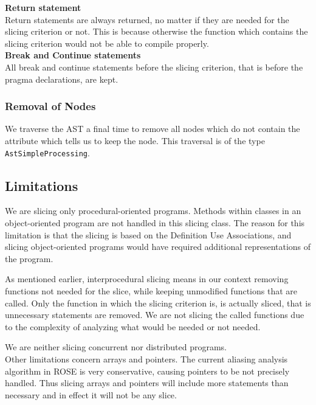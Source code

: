 \documentclass[11pt,a4paper,twoside]{article}
\begin{document}
\noindent
\textbf{Return statement}\\
Return statements are always returned, no matter if they are needed for the slicing criterion or not. This is because otherwise the function which contains the slicing criterion would not be able to compile properly.\\

\noindent
\textbf{Break and Continue statements}\\
All break and continue statements before the slicing criterion, that is before the pragma declarations, are kept.

\subsubsection{Removal of Nodes}
We traverse the AST a final time to remove all nodes which do not contain the attribute which tells us to keep the node. This traversal is of the type \texttt{AstSimpleProcessing}.

\subsection{Limitations}
We are slicing only procedural-oriented programs. Methods within classes in an object-oriented program are not handled in this slicing class. The reason for this limitation is that the slicing is based on the Definition Use Associations, and slicing object-oriented programs would have required additional representations of the program.

As mentioned earlier, interprocedural slicing means in our context removing functions not needed for the slice, while keeping unmodified functions that are called. Only the function in which the slicing criterion is, is actually sliced, that is unnecessary statements are removed. We are not slicing the called functions due to the complexity of analyzing what would be needed or not needed.

We are neither slicing concurrent nor distributed programs.\\

\noindent
Other limitations concern arrays and pointers. The current aliasing analysis algorithm in ROSE is very conservative, causing pointers to be not precisely handled. Thus slicing arrays and pointers will include more statements than necessary and in effect it will not be any slice.


\end{document}
